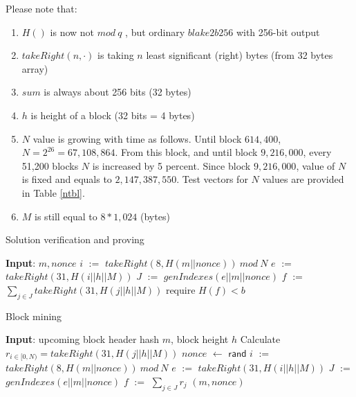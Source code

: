 \documentclass[]{article}
\def\Let#1#2{\State #1 $:=$ #2}
\def\LetRnd#1#2{\State #1 $\gets$ #2}
\begin{document}
    Please note that:
    \begin{enumerate}
        \item{} $H()$ is now not $mod\ q$ , but ordinary $blake2b256$ with 256-bit output
        \item{} $takeRight(n, \cdot)$ is taking $n$ least significant (right) bytes (from 32 bytes array)
        \item{} $sum$ is always about 256 bits (32 bytes)
        \item{} $h$ is height of a block (32 bits = 4 bytes)
        \item{} $N$ value is growing with time as follows. Until block $614,400$, $N = 2^{26} = 67,108,864$.
                From this block, and until block $9,216,000$, every 51,200 blocks $N$ is increased by 5 percent.
                Since block $9,216,000$, value of $N$ is fixed and equals to $2,147,387,550$. Test vectors for
                $N$ values are provided in Table \ref{ntbl}.

        \item{} $M$ is still equal to $8 * 1,024$ (bytes)
    \end{enumerate} 

    \begin{algorithm}[H]
        \caption{Solution verification and proving}
        \label{alg:verify2}
        \begin{algorithmic}[1]
            \State \textbf{Input}: $m, nonce$
            \Let{$i$}{$takeRight(8, H(m || nonce))\ mod\ N$}
            \Let{$e$}{$takeRight(31, H(i || h || M))$}
            \Let{$J$}{$genIndexes(e || m || nonce)$}
            \Let{$f$}{$\sum_{j \in J} takeRight(31, H(j || h || M))$}
            \State require $H(f) < b$
        \end{algorithmic}
    \end{algorithm}

    \begin{algorithm}[H]
        \caption{Block mining}
        \label{alg:prove2}
        \begin{algorithmic}[1]
            \State \textbf{Input}: upcoming block header hash $m$, block height $h$
            \State Calculate $r_{i \in [0,N)} = takeRight(31, H(j || h || M))$
            \LetRnd{$nonce$}{$\mathsf{rand}$}
            \Let{$i$}{$takeRight(8, H(m || nonce))\ mod\ N$}
            \Let{$e$}{$takeRight(31, H(i || h || M))$}
            \Let{$J$}{$genIndexes(e || m || nonce)$}
            \Let{$f$}{$\sum_{j \in J}{r_j}$}
            \State \Return $(m, nonce)$
            \EndIf
            \EndWhile
        \end{algorithmic}
    \end{algorithm}
\end{document}
